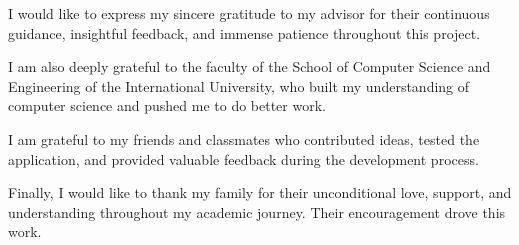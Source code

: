 \begin{acknowledgments}

I would like to express my sincere gratitude to my advisor for their continuous guidance, insightful feedback, and immense patience throughout this project.

I am also deeply grateful to the faculty of the School of Computer Science and Engineering of the International University, who built my understanding of computer science and pushed me to do better work.

I am grateful to my friends and classmates who contributed ideas, tested the application, and provided valuable feedback during the development process.

Finally, I would like to thank my family for their unconditional love, support, and understanding throughout my academic journey. Their encouragement drove this work.

\end{acknowledgments}

